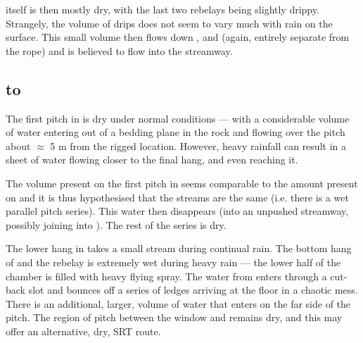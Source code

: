  itself is then mostly dry, with the last two rebelays being
slightly drippy. Strangely, the volume of drips does not seem to vary
much with rain on the surface. This small volume then flows 
down ,  and  (again, entirely separate
from the rope) and is believed to flow into the  streamway.

\subsection{ to }

The first pitch in  is dry under normal conditions --- with a considerable
volume of water entering out of a bedding plane in the rock and flowing over
the pitch about $\approx$ 5 m from the rigged location. However, heavy
rainfall can result in a sheet of water flowing closer to the final hang, and
even reaching it. 

The volume present on the first pitch in  seems comparable to the amount
present on  and it is thus hypothesised that the streams are the
same (i.e. there is a wet parallel pitch series). This water then disappears
(into an unpushed streamway, possibly joining into ). The rest of the
 series is dry.

The lower hang in  takes a small stream during continual rain. The
bottom hang of  and the rebelay is extremely wet during heavy rain
--- the lower half of the chamber is filled with heavy
flying spray. The water from  enters through a cut-back slot and bounces
off a series of ledges arriving at the floor in a chaotic mess. 
There is an additional, larger, volume of water that enters on the far side of
the  pitch. The region of  pitch between the  window and 
remains dry, and this may offer an alternative, dry, SRT route. 

